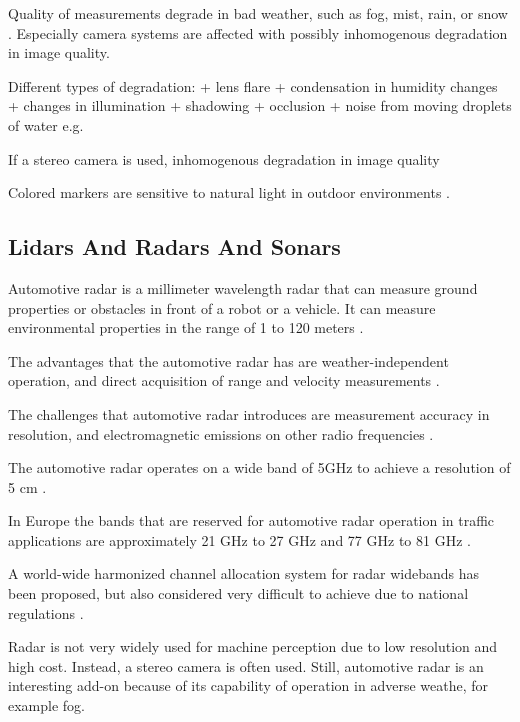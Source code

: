 \documentclass[12pt,a4paper,oneside,pdftex]{report}
\begin{document}

Quality of measurements degrade in bad weather, such as fog, mist, rain, or snow \cite{Kawai12}. 
Especially camera systems are affected with possibly inhomogenous degradation in image quality.

Different types of degradation:
    + lens flare
    + condensation in humidity changes
    + changes in illumination
    + shadowing
    + occlusion
    + noise from moving droplets of water e.g.

If a stereo camera is used, inhomogenous degradation in image quality


Colored markers are sensitive to natural light in outdoor environments \cite{Kawai12}.

    
\subsection{Lidars And Radars And Sonars}
\label{subsection:lidars_and_radars_and_sonars}

Automotive radar is a millimeter wavelength radar that can measure ground properties or obstacles in front of a robot or a vehicle. It can measure environmental properties in the range of 1 to 120 meters \cite{Ahtiainen12}.

The advantages that the automotive radar has are weather-independent operation, and direct acquisition of range and velocity measurements \cite{Wenger07}.

The challenges that automotive radar introduces are measurement accuracy in resolution, and electromagnetic emissions on other radio frequencies \cite{Wenger07}. 

The automotive radar operates on a wide band of 5GHz to achieve a resolution of 5 cm \cite{Wenger07}.

In Europe the bands that are reserved for automotive radar operation in traffic applications are approximately 21 GHz to 27 GHz and 77 GHz to 81 GHz \cite{Wenger07}.

A world-wide harmonized channel allocation system for radar widebands has been proposed, but also considered very difficult to achieve due to national regulations \cite{Wenger07}.

Radar is not very widely used for machine perception due to low resolution and high cost. Instead, a stereo camera is often used. Still, automotive radar is an interesting add-on because of its capability of operation in adverse weathe, for example fog. 
\end{document}
